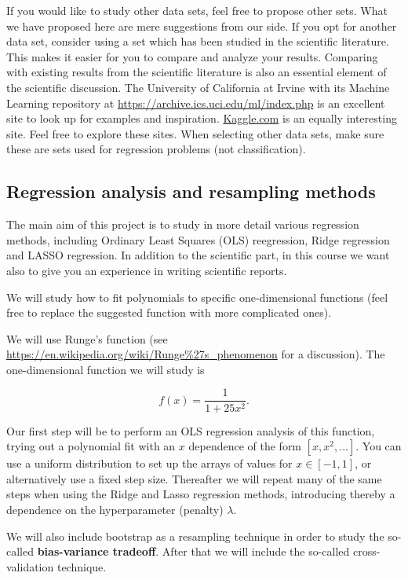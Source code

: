 \documentclass[11pt]{article}
\begin{document}
If you would like to study other data sets, feel free to propose other
sets. What we have proposed here are mere suggestions from our side. If
you opt for another data set, consider using a set which has been
studied in the scientific literature. This makes it easier for you to
compare and analyze your results. Comparing with existing results from
the scientific literature is also an essential element of the scientific
discussion. The University of California at Irvine with its Machine
Learning repository at \url{https://archive.ics.uci.edu/ml/index.php} is
an excellent site to look up for examples and inspiration.
\href{https://www.kaggle.com/}{Kaggle.com} is an equally interesting
site. Feel free to explore these sites. When selecting other data sets,
make sure these are sets used for regression problems (not
classification).

    \hypertarget{regression-analysis-and-resampling-methods}{%
\subsection*{Regression analysis and resampling
methods}\label{regression-analysis-and-resampling-methods}}

The main aim of this project is to study in more detail various
regression methods, including Ordinary Least Squares (OLS) reegression,
Ridge regression and LASSO regression. In addition to the scientific
part, in this course we want also to give you an experience in writing
scientific reports.

We will study how to fit polynomials to specific one-dimensional
functions (feel free to replace the suggested function with more
complicated ones).

We will use Runge's function (see
\url{https://en.wikipedia.org/wiki/Runge\%27s_phenomenon} for a
discussion). The one-dimensional function we will study is

    \[
f(x) = \frac{1}{1+25x^2}.
\]

    Our first step will be to perform an OLS regression analysis of this
function, trying out a polynomial fit with an \(x\) dependence of the
form \([x,x^2,\dots]\). You can use a uniform distribution to set up the
arrays of values for \(x \in [-1,1]\), or alternatively use a fixed step
size. Thereafter we will repeat many of the same steps when using the
Ridge and Lasso regression methods, introducing thereby a dependence on
the hyperparameter (penalty) \(\lambda\).

We will also include bootstrap as a resampling technique in order to
study the so-called \textbf{bias-variance tradeoff}. After that we will
include the so-called cross-validation technique.
\end{document}
